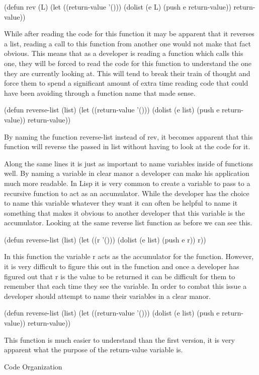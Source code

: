 \documentclass{article}
\begin{document}
(defun rev (L)
  (let ((return-value '()))
    (dolist (e L) (push e return-value))
    return-value))

While after reading the code for this function it may be apparent that it reverses a list, reading a call to this function from another one would not make that fact obvious. This means that as a developer is reading a function which calls this one, they will be forced to read the code for this function to understand the one they are currently looking at. This will tend to break their train of thought and force them to spend a significant amount of extra time reading code that could have been avoiding through a function name that made sense.

(defun reverse-list (list)
  (let ((return-value '()))
    (dolist (e list) (push e return-value))
    return-value))

By naming the function reverse-list instead of rev, it becomes apparent that this function will reverse the passed in list without having to look at the code for it.

Along the same lines it is just as important to name variables inside of functions well. By naming a variable in clear manor a developer can make his application much more readable. In Lisp it is very common to create a variable to pass to a recursive function to act as an accumulator. While the developer has the choice to name this variable whatever they want it can often be helpful to name it something that makes it obvious to another developer that this variable is the accumulator. Looking at the same reverse list function as before we can see this.

(defun reverse-list (list)
  (let ((r '()))
    (dolist (e list) (push e r))
    r))

In this function the variable r acts as the accumulator for the function. However, it is very difficult to figure this out in the function and once a developer has figured out that r is the value to be returned it can be difficult for them to remember that each time they see the variable. In order to combat this issue a developer should attempt to name their variables in a clear manor.

(defun reverse-list (list)
  (let ((return-value '()))
    (dolist (e list) (push e return-value))
    return-value))


This function is much easier to understand than the first version, it is very apparent what the purpose of the return-value variable is.

Code Organization
\end{document}
